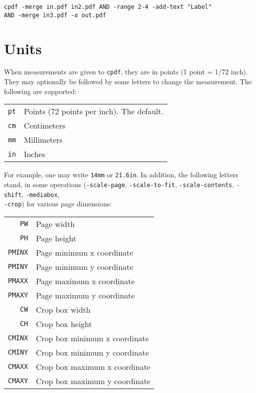 \documentclass{book}
\newcommand{\cpdf}{\texttt{cpdf}}
\begin{document}
\begin{framed}
  \small\verb!cpdf -merge in.pdf in2.pdf AND -range 2-4 -add-text "Label"!
  \noindent\small\verb!        AND -merge in3.pdf -o out.pdf!

\end{framed}

\section{Units}
When measurements are given to \cpdf, they are in points (1 point = 1/72 inch). They may optionally
be followed by some letters to change the measurement. The following are
supported:

\begin{center}
\begin{tabular}{rl}
  \texttt{pt} & Points (72 points per inch). The default. \\
  \texttt{cm} & Centimeters \\
  \texttt{mm} & Millimeters \\
  \texttt{in} & Inches \\
\end{tabular}
\end{center}

\noindent For example, one may write \texttt{14mm} or \texttt{21.6in}. In addition, the following letters stand, in some operations (\texttt{-scale-page}, \texttt{-scale-to-fit}, \texttt{-scale-contents}, \texttt{-shift}, \texttt{-mediabox},\\ \texttt{-crop}) for various page dimensions:

\begin{center}
\begin{tabular}{rl}
  \texttt{PW} & Page width\\
  \texttt{PH} & Page height\\
  \texttt{PMINX} & Page minimum x coordinate\\
  \texttt{PMINY} & Page minimum y coordinate\\
  \texttt{PMAXX} & Page maximum x coordinate\\
  \texttt{PMAXY} & Page maximum y coordinate\\
  \texttt{CW} & Crop box width\\
  \texttt{CH} & Crop box height\\
  \texttt{CMINX} & Crop box minimum x coordinate\\
  \texttt{CMINY} & Crop box minimum y coordinate\\
  \texttt{CMAXX} & Crop box maximum x coordinate\\
  \texttt{CMAXY} & Crop box maximum y coordinate
\end{tabular}
\end{center}
\end{document}
